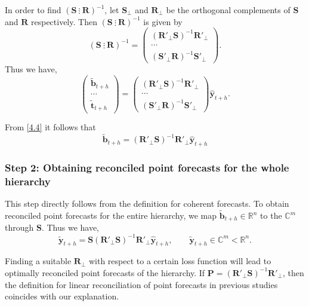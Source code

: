 \documentclass[a4paper, 11pt]{article}
\begin{document}
In order to find $(\bm{S} ~ \vdots~ \bm{R})^{-1}$, let $\bm{S}_{\bot}$ and $\bm{R}_{\bot}$ be the orthogonal complements of $\bm{S}$ and $\bm{R}$
respectively. Then $(\bm{S} ~ \vdots~ \bm{R})^{-1}$ is given by
\begin{equation}
(\bm{S} ~ \vdots~ \bm{R})^{-1} = \begin{pmatrix}
(\bm{R}'_\bot \bm{S})^{-1}\bm{R}'_\bot \\ \cdots \\ (\bm{S}'_\bot \bm{R})^{-1}\bm{S}'_\bot
\end{pmatrix}.
\end{equation}
Thus we have,
\begin{equation} \label{4.4}
\begin{pmatrix}
\tilde{\bm{b}}_{t+h} \\ \cdots \\ \tilde{\bm{t}}_{t+h}
\end{pmatrix} = \begin{pmatrix}
(\bm{R}'_\bot \bm{S})^{-1}\bm{R}'_\bot \\ \cdots \\ (\bm{S}'_\bot \bm{R})^{-1}\bm{S}'_\bot
\end{pmatrix}\hat{\bm{y}}_{t+h}.
\end{equation}

From \eqref{4.4} it follows that
\begin{equation}
\tilde{\bm{b}}_{t+h}=(\bm{R}'_\bot \bm{S})^{-1}\bm{R}'_\bot \hat{\bm{y}}_{t+h}
\end{equation}

\subsubsection*{Step 2: Obtaining reconciled point forecasts for the whole hierarchy}

This step directly follows from the definition for coherent forecasts. To obtain reconciled point forecasts for the entire hierarchy, we map $\tilde{\bm{b}}_{t+h} \in \mathbb{R}^n$ to the $\mathbb{C}^m$ through $\bm{S}$. Thus we have, 
\begin{equation}
\tilde{\bm{y}}_{t+h}=\bm{S}(\bm{R}'_\bot \bm{S})^{-1}\bm{R}'_\bot \hat{\bm{y}}_{t+h}, \qquad \tilde{\bm{y}}_{t+h} \in \mathbb{C}^m<\mathbb{R}^n.
\end{equation}

Finding a suitable $\bm{R}_\bot$ with respect to a certain loss function will lead to optimally reconciled point forecasts of the hierarchy. If $\bm{P}=(\bm{R}'_\bot \bm{S})^{-1}\bm{R}'_\bot$, then the definition for linear reconciliation of point forecasts in previous studies coincides with our explanation.
\end{document}
